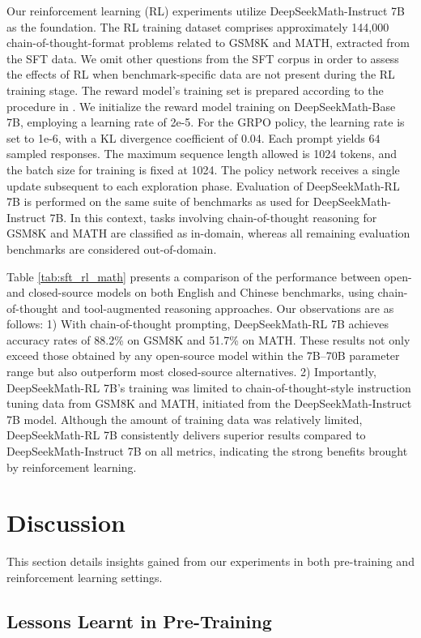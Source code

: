 \begin{itemize}[topsep=0pt]
\begin{itemize}[topsep=0pt]
Our reinforcement learning (RL) experiments utilize DeepSeekMath-Instruct 7B as the foundation. The RL training dataset comprises approximately 144,000 chain-of-thought-format problems related to GSM8K and MATH, extracted from the SFT data. We omit other questions from the SFT corpus in order to assess the effects of RL when benchmark-specific data are not present during the RL training stage. The reward model's training set is prepared according to the procedure in \citep{wang2023math}. We initialize the reward model training on DeepSeekMath-Base 7B, employing a learning rate of 2e-5. For the GRPO policy, the learning rate is set to 1e-6, with a KL divergence coefficient of 0.04. Each prompt yields $64$ sampled responses. The maximum sequence length allowed is 1024 tokens, and the batch size for training is fixed at 1024. The policy network receives a single update subsequent to each exploration phase. Evaluation of DeepSeekMath-RL 7B is performed on the same suite of benchmarks as used for DeepSeekMath-Instruct 7B. In this context, tasks involving chain-of-thought reasoning for GSM8K and MATH are classified as in-domain, whereas all remaining evaluation benchmarks are considered out-of-domain.

Table \ref{tab:sft_rl_math} presents a comparison of the performance between open- and closed-source models on both English and Chinese benchmarks, using chain-of-thought and tool-augmented reasoning approaches. Our observations are as follows: 1) With chain-of-thought prompting, DeepSeekMath-RL 7B achieves accuracy rates of 88.2\% on GSM8K and 51.7\% on MATH. These results not only exceed those obtained by any open-source model within the 7B–70B parameter range but also outperform most closed-source alternatives. 2) Importantly, DeepSeekMath-RL 7B's training was limited to chain-of-thought-style instruction tuning data from GSM8K and MATH, initiated from the DeepSeekMath-Instruct 7B model. Although the amount of training data was relatively limited, DeepSeekMath-RL 7B consistently delivers superior results compared to DeepSeekMath-Instruct 7B on all metrics, indicating the strong benefits brought by reinforcement learning.

\section{Discussion}
This section details insights gained from our experiments in both pre-training and reinforcement learning settings.

\subsection{Lessons Learnt in Pre-Training}


\end{itemize}
\end{itemize}
